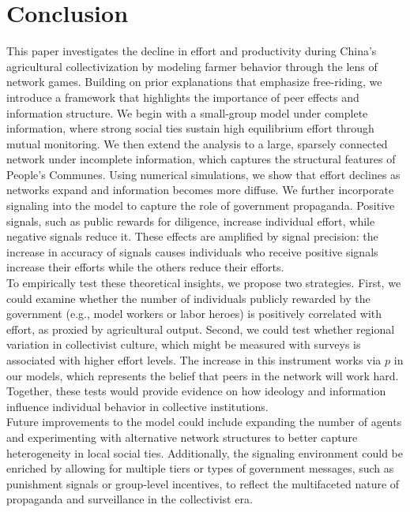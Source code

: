 \documentclass[12pt]{article}
\begin{document}
\section{Conclusion}
This paper investigates the decline in effort and productivity during China's agricultural collectivization by modeling farmer behavior through the lens of network games. Building on prior explanations that emphasize free-riding, we introduce a framework that highlights the importance of peer effects and information structure. We begin with a small-group model under complete information, where strong social ties sustain high equilibrium effort through mutual monitoring. We then extend the analysis to a large, sparsely connected network under incomplete information, which captures the structural features of People's Communes. Using numerical simulations, we show that effort declines as networks expand and information becomes more diffuse. We further incorporate signaling into the model to capture the role of government propaganda. Positive signals, such as public rewards for diligence, increase individual effort, while negative signals reduce it. These effects are amplified by signal precision: the increase in accuracy of signals causes individuals who receive positive signals increase their efforts while the others reduce their efforts.\\
To empirically test these theoretical insights, we propose two strategies. First, we could examine whether the number of individuals publicly rewarded by the government (e.g., model workers or labor heroes) is positively correlated with effort, as proxied by agricultural output. Second, we could test whether regional variation in collectivist culture, which might be measured with surveys is associated with higher effort levels. The increase in this instrument works via $p$ in our models, which represents the belief that peers in the network will work hard. Together, these tests would provide evidence on how ideology and information influence individual behavior in collective institutions.\\
Future improvements to the model could include expanding the number of agents and experimenting with alternative network structures to better capture heterogeneity in local social ties. Additionally, the signaling environment could be enriched by allowing for multiple tiers or types of government messages, such as punishment signals or group-level incentives, to reflect the multifaceted nature of propaganda and surveillance in the collectivist era.
  
\end{document}
